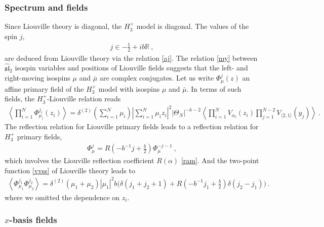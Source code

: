 \documentclass[12pt, a4paper, notitlepage, twoside]{report}
\numberwithin{equation}{section}
\theoremstyle{break}
\begin{document}
\subsubsection{Spectrum and fields}

Since Liouville theory is diagonal, the $H_3^+$ model is diagonal.
The values of the spin $j$,
\begin{align}
 \boxed{j\in -\frac12 + ib\mathbb{R}}\ , 
\end{align}
are deduced from Liouville theory via the relation \eqref{aj}. The relation \eqref{my} between $\widehat{\mathfrak{sl}}_2$ isospin variables and positions of Liouville fields suggests that the left- and right-moving isospins $\mu$ and $\bar\mu$ are complex conjugates. Let us write $\Phi^j_\mu(z)$ an affine primary field of the $H_3^+$ model with isospins $\mu$ and $\bar\mu$. In terms of such fields, the $H_3^+$-Liouville relation reads 
\begin{align}
 \boxed{ \left\langle \prod_{i=1}^N \Phi^{j_i}_{\mu_i}(z_i)\right\rangle 
 = \delta^{(2)}\left({\textstyle\sum_{i=1}^N \mu_i}\right) 
 \left|{\textstyle\sum_{i=1}^N\mu_iz_i}\right|^2 |\Theta_N|^{-k-2} 
 \left\langle \prod_{i=1}^N V_{\alpha_i}(z_i)\prod_{j=1}^{N-2}V_{\langle 2,1\rangle}(y_j)\right\rangle}\ .
\label{dyym} 
\end{align}
The reflection relation for Liouville primary fields leads to a reflection relation for $H_3^+$ primary fields,
\begin{align}
 \Phi^j_{\mu} = R(-b^{-1}j+\tfrac{b}{2}) \Phi^{-j-1}_{\mu} \ ,
\end{align}
which involves the Liouville reflection coefficient $R(\alpha)$ \eqref{ram}.
And the two-point function \eqref{vvss} of Liouville theory leads to
\begin{align}
 \left\langle \Phi^{j_1}_{\mu_1} \Phi^{j_2}_{\mu_2}\right\rangle = \delta^{(2)}(\mu_1+\mu_2) |\mu_1|^2 b\Big(\delta(j_1+j_2+1)+R\left(-b^{-1}j_1+\tfrac{b}{2}\right) \delta(j_2-j_1) \Big)\ .
\end{align}
where we omitted the dependence on $z_i$.

\subsubsection{$x$-basis fields}
\end{document}
